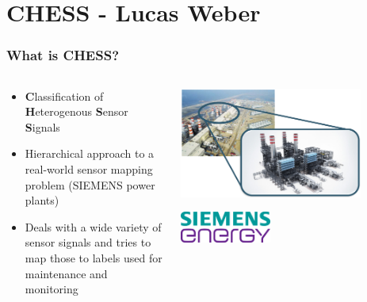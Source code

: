 \section{CHESS - Lucas Weber}


\begin{frame}
	\frametitle{What is CHESS?}
	\begin{columns}
		\begin{column}{0.5\textwidth}
			\begin{itemize}
				\item \textbf{C}lassification of \textbf{H}eterogenous \textbf{S}ensor \textbf{S}ignals\footnotemark
				\item Hierarchical approach to a real-world sensor mapping problem (SIEMENS power plants)
				\item Deals with a wide variety of sensor signals and tries to map those to labels used for maintenance and monitoring
			\end{itemize}
		\end{column}
		\begin{column}{0.45\textwidth}
			\vspace*{-3em}
			\begin{flushright}
				\includegraphics[width=0.8\textwidth]{img/research/PowerPlant.png}
				\begin{center}
					\includegraphics[width=0.4\textwidth]{img/research/SElogo.png}
				\end{center}
			\end{flushright}
		\end{column}
	\end{columns}
\end{frame}

